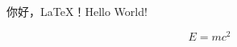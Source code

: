 \documentclass[UTF8]{ctexart}
\begin{document}
你好，LaTeX！Hello World!

\[ E = mc^2 \]
\end{document}
